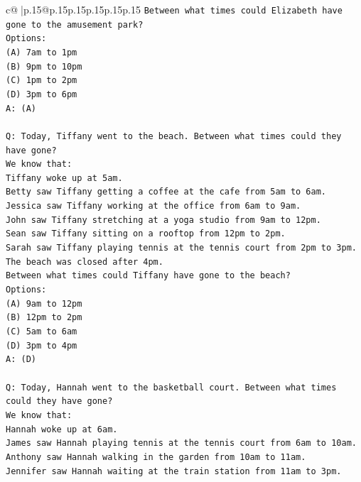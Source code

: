 \documentclass{article}
\begin{document}
{\begin{supertabular}{c@{$\;$}|p{.15\linewidth}@{}p{.15\linewidth}p{.15\linewidth}p{.15\linewidth}p{.15\linewidth}p{.15\linewidth}}
{{{\texttt{Between what times could Elizabeth have gone to the amusement park?} \\
\texttt{Options:} \\
\texttt{(A) 7am to 1pm} \\
\texttt{(B) 9pm to 10pm} \\
\texttt{(C) 1pm to 2pm} \\
\texttt{(D) 3pm to 6pm} \\
\texttt{A: (A)} \\
\\ 
\texttt{Q: Today, Tiffany went to the beach. Between what times could they have gone?} \\
\texttt{We know that:} \\
\texttt{Tiffany woke up at 5am.} \\
\texttt{Betty saw Tiffany getting a coffee at the cafe from 5am to 6am.} \\
\texttt{Jessica saw Tiffany working at the office from 6am to 9am.} \\
\texttt{John saw Tiffany stretching at a yoga studio from 9am to 12pm.} \\
\texttt{Sean saw Tiffany sitting on a rooftop from 12pm to 2pm.} \\
\texttt{Sarah saw Tiffany playing tennis at the tennis court from 2pm to 3pm.} \\
\texttt{The beach was closed after 4pm.} \\
\texttt{Between what times could Tiffany have gone to the beach?} \\
\texttt{Options:} \\
\texttt{(A) 9am to 12pm} \\
\texttt{(B) 12pm to 2pm} \\
\texttt{(C) 5am to 6am} \\
\texttt{(D) 3pm to 4pm} \\
\texttt{A: (D)} \\
\\ 
\texttt{Q: Today, Hannah went to the basketball court. Between what times could they have gone?} \\
\texttt{We know that:} \\
\texttt{Hannah woke up at 6am.} \\
\texttt{James saw Hannah playing tennis at the tennis court from 6am to 10am.} \\
\texttt{Anthony saw Hannah walking in the garden from 10am to 11am.} \\
\texttt{Jennifer saw Hannah waiting at the train station from 11am to 3pm.} \\
}}}
\end{supertabular}}
\end{document}
